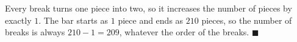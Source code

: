 Every break turns one piece into two, so it increases the number of pieces by exactly $1$. The bar starts as $1$ piece and ends as $210$ pieces, so the number of breaks is always $210-1=\boxed{209}$, whatever the order of the breaks. $\blacksquare$
